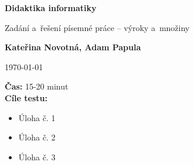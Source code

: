 \documentclass[12pt,a4paper,addpoints]{exam}
\def\maintitle{Didaktika informatiky}
\def\subtitle{Zadání a~řešení písemné práce -- výroky a~množiny}
\def\authorname{Kateřina Novotná, Adam Papula}
\begin{document}
    \begin{titlepage}
        \begin{center}
            \Large\textbf{{\maintitle}}

            \normalsize
            \vspace{0.5cm}
                \subtitle
            \vspace{1.5cm}
            
            \textbf{\authorname}
            \vspace{1.5cm}

            \today
            \vfill
            
            \raggedright
                \textbf{Čas:} 15-20 minut\\
                \textbf{Cíle testu:}
                \noindent
                \begin{itemize}[topsep=0pt]
                \item Úloha č. 1\\
                \item Úloha č. 2\\
                \item Úloha č. 3\\
                \end{itemize}
        \end{center}
    \end{titlepage}

    
    
\end{document}

